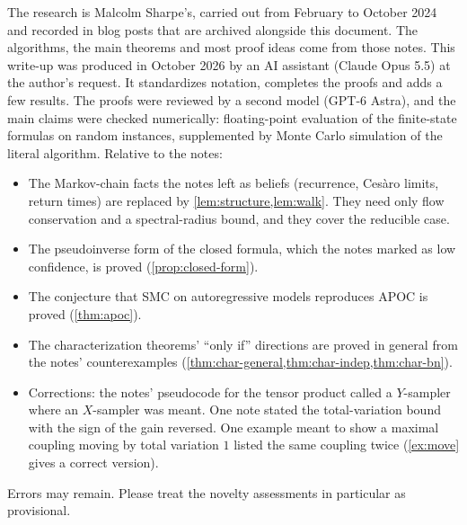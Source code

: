 \documentclass[11pt]{article}
\theoremstyle{definition}
\begin{document}
The research is Malcolm Sharpe's, carried out from February to October 2024
and recorded in blog posts that are archived alongside this document. The
algorithms, the main theorems and most proof ideas come from those notes. This
write-up was produced in October 2026 by an AI assistant (Claude Opus 5.5) at the
author's request. It standardizes notation, completes the proofs and adds a
few results. The proofs were reviewed by a second model (GPT-6 Astra), and the
main claims were checked numerically: floating-point evaluation of the
finite-state formulas on random instances, supplemented by Monte Carlo
simulation of the literal algorithm.
Relative to the notes:
\begin{itemize}
  \item The Markov-chain facts the notes left as beliefs (recurrence, Cesàro
  limits, return times) are replaced by \cref{lem:structure,lem:walk}. They
  need only flow conservation and a spectral-radius bound, and they cover the
  reducible case.
  \item The pseudoinverse form of the closed formula, which the notes marked
  as low confidence, is proved (\cref{prop:closed-form}).
  \item The conjecture that SMC on autoregressive models reproduces APOC is
  proved (\cref{thm:apoc}).
  \item The characterization theorems' ``only if'' directions are proved in
  general from the notes' counterexamples (\cref{thm:char-general,thm:char-indep,thm:char-bn}).
  \item Corrections: the notes' pseudocode for the tensor product called a
  $Y$-sampler where an $X$-sampler was meant. One note stated the
  total-variation bound with the sign of the gain reversed. One example meant
  to show a maximal coupling moving by total variation $1$ listed the same
  coupling twice (\cref{ex:move} gives a correct version).
\end{itemize}
Errors may remain. Please treat the novelty assessments in particular as
provisional.
\end{document}
